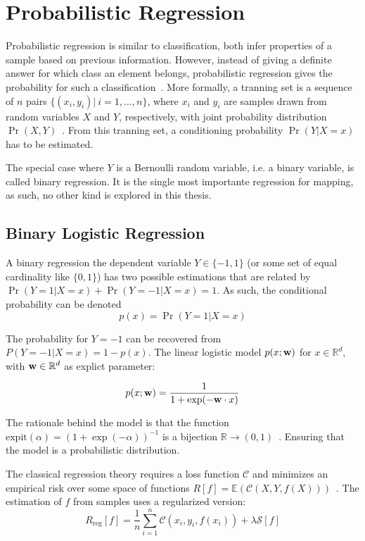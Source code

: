 
\section{Probabilistic Regression}

Probabilistic regression is similar to classification, both infer properties of
a sample based on previous information. However, instead of giving a definite
answer for which class an element belongs, probabilistic regression gives the
probability for such a classification~\cite{jaakkola1999probabilistic}. More
formally, a tranning set is a sequence of $n$ pairs
$\{(x_i,y_i)|~i=1,\ldots,n\}$, where $x_i$ and $y_i$ are samples drawn from
random variables $X$ and $Y$, respectively, with joint probability distribution
$\Pr(X,Y)$~\cite{friedman2001elements}. From this tranning set, a conditioning
probability $\Pr(Y|X=x)$ has to be estimated.

The special case where $Y$ is a Bernoulli random variable, i.e. a binary
variable, is called binary regression. It is the single most importante
regression for mapping, as such, no other kind is explored in this thesis. 

\subsection{Binary Logistic Regression} 

A binary regression the dependent variable $Y\in\{-1,1\}$
(or some set of equal cardinality like $\{0,1\}$) has two
possible estimations that are related by $\Pr(Y=1|X=x)+\Pr(Y=-1|X=x)=1$. As
such, the conditional probability can be denoted
\begin{equation*}
p(x) = \Pr(Y=1|X=x) 
\end{equation*}

The probability for $Y=-1$ can be recovered from $P(Y=-1|X=x)=1-p(x)$. The
linear logistic model $p(x;\mathrm{\mathbf{w}})$ for $x\in\mathbb{R}^d$, with
$\mathrm{\mathbf{w}}\in\mathbb{R}^d$ as explict parameter:

\begin{equation}
p(x;\mathrm{\mathbf{w}}) = \frac{1}{1+\exp(-\mathrm{\mathbf{w}}\cdot x)}
\end{equation}

The rationale behind the model is that the function
$\text{expit}(\alpha)=(1+\exp(-\alpha))^{-1}$ is a bijection
$\mathbb{R}\to(0,1)$~\cite{friedman2001elements}. Ensuring that the model is a
probabilistic distribution.

The classical regression theory requires a loss function $\mathscr{C}$ and
minimizes an empirical risk over some space of functions
$R[f]=\mathbb{E}(\mathscr{C}(X,Y,f(X)))$~\cite{jaakkola1999probabilistic}. The
estimation of $f$ from samples uses a regularized version:
\begin{equation}
R_{\text{reg}}[f] =
\frac{1}{n}\sum_{i=1}^n\mathscr{C}(x_i,y_i,f(x_i))+\lambda\mathcal{S}[f]
\end{equation}

